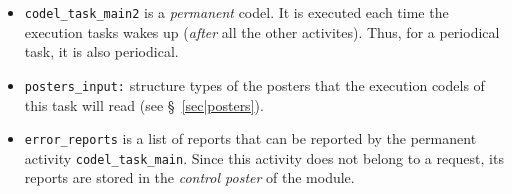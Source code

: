 \begin{itemize}
\item \texttt{codel\_task\_main2} is a \emph{permanent} codel. It is executed each time
the execution tasks wakes  up (\emph{after} all the other activites). Thus, for  a  periodical task, it is  also
periodical.

\item \texttt{posters\_input:} structure types of the posters that the
execution codels of this task will read (see \S~\vref{sec|posters}).

\item \texttt{error\_reports} is a list of reports that can be reported by the
permanent activity \texttt{codel\_task\_main}. Since  this activity does not belong to
a request, its  reports are  stored in  the  \emph{control poster} of  the
module.
\end{itemize}
